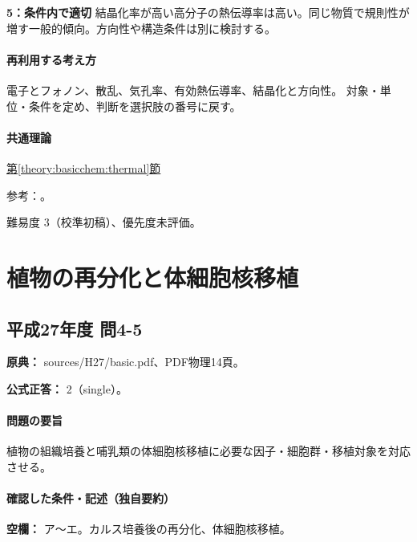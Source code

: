 \noindent\textbf{5：条件内で適切} 結晶化率が高い高分子の熱伝導率は高い。同じ物質で規則性が増す一般的傾向。方向性や構造条件は別に検討する。\par

\paragraph{再利用する考え方} 電子とフォノン、散乱、気孔率、有効熱伝導率、結晶化と方向性。 対象・単位・条件を定め、判断を選択肢の番号に戻す。

\paragraph{共通理論} \hyperref[theory:basicchem:thermal]{第\ref*{theory:basicchem:thermal}節}

\par 参考：\cite{aist_metal_thermal,openstax_thermal_conduction,chem55_polymer}。

\par 難易度 3（校準初稿）、優先度未評価。

\section{植物の再分化と体細胞核移植}

\subsection{平成27年度 問4-5}
\label{q:h27-reg-basic-4-5}

\noindent\textbf{原典：} sources/H27/basic.pdf、PDF物理14頁。

\textbf{公式正答：} 2（single）。

\paragraph{問題の要旨} 植物の組織培養と哺乳類の体細胞核移植に必要な因子・細胞群・移植対象を対応させる。

\paragraph{確認した条件・記述（独自要約）}\mbox{}\par

\noindent\textbf{空欄：} ア〜エ。カルス培養後の再分化、体細胞核移植。\par

